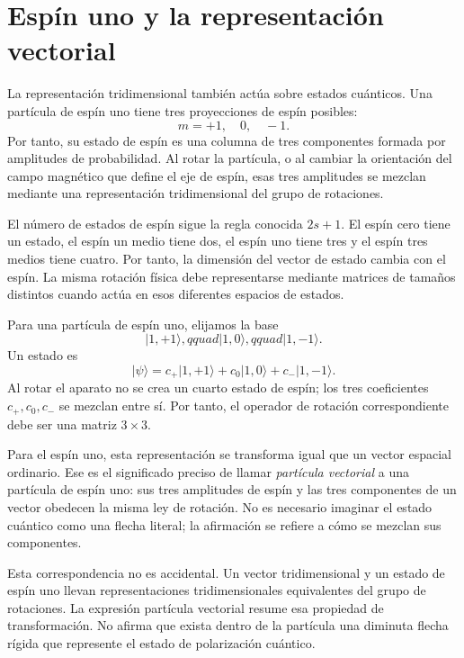 \section{Espín uno y la representación vectorial}

La representación tridimensional también actúa sobre estados cuánticos. Una partícula de espín uno tiene tres proyecciones de espín posibles:
\begin{equation}
m=+1,\quad 0,\quad -1.
\end{equation}
Por tanto, su estado de espín es una columna de tres componentes formada por amplitudes de probabilidad. Al rotar la partícula, o al cambiar la orientación del campo magnético que define el eje de espín, esas tres amplitudes se mezclan mediante una representación tridimensional del grupo de rotaciones.

El número de estados de espín sigue la regla conocida \(2s+1\). El espín cero tiene un estado, el espín un medio tiene dos, el espín uno tiene tres y el espín tres medios tiene cuatro. Por tanto, la dimensión del vector de estado cambia con el espín. La misma rotación física debe representarse mediante matrices de tamaños distintos cuando actúa en esos diferentes espacios de estados.

Para una partícula de espín uno, elijamos la base
\begin{equation}
\lvert 1,+1\rangle,qquad
\lvert 1,0\rangle,qquad
\lvert 1,-1\rangle.
\end{equation}
Un estado es
\begin{equation}
\lvert\psi\rangle
=c_{+}\lvert1,+1\rangle+c_0\lvert1,0\rangle+c_{-}\lvert1,-1\rangle.
\end{equation}
Al rotar el aparato no se crea un cuarto estado de espín; los tres coeficientes \(c_+,c_0,c_-\) se mezclan entre sí. Por tanto, el operador de rotación correspondiente debe ser una matriz \(3\times3\).

Para el espín uno, esta representación se transforma igual que un vector espacial ordinario. Ese es el significado preciso de llamar \emph{partícula vectorial} a una partícula de espín uno: sus tres amplitudes de espín y las tres componentes de un vector obedecen la misma ley de rotación. No es necesario imaginar el estado cuántico como una flecha literal; la afirmación se refiere a cómo se mezclan sus componentes.

Esta correspondencia no es accidental. Un vector tridimensional y un estado de espín uno llevan representaciones tridimensionales equivalentes del grupo de rotaciones. La expresión {partícula vectorial} resume esa propiedad de transformación. No afirma que exista dentro de la partícula una diminuta flecha rígida que represente el estado de polarización cuántico.

